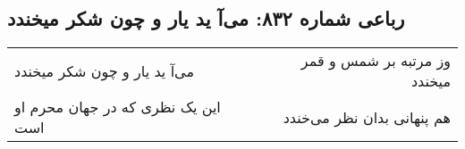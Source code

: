 \begin{center}
\section*{رباعی شماره ۸۳۲: می‌آ ید یار و چون شکر میخندد}
\label{sec:0832}
\begin{longtable}{l p{0.5cm} r}
می‌آ ید یار و چون شکر میخندد
&&
وز مرتبه بر شمس و قمر میخندد
\\
این یک نظری که در جهان محرم او است
&&
هم پنهانی بدان نظر می‌خندد
\\
\end{longtable}
\end{center}
